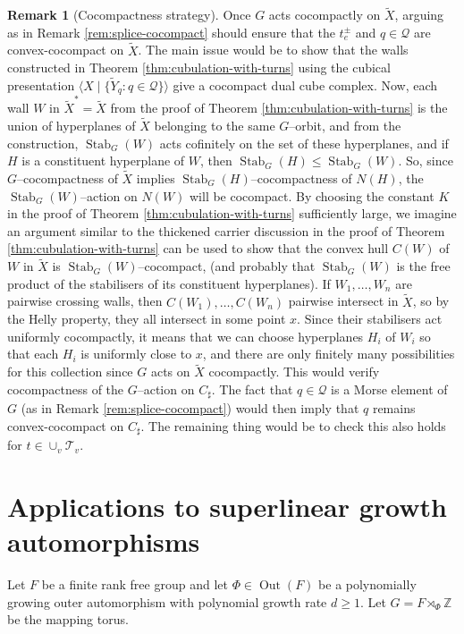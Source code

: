 \documentclass[11pt,oneside]{amsart}
\theoremstyle{definition}
\newtheorem{rem}[thm]{Remark}
\DeclareMathOperator{\Out}{Out}
\DeclareMathOperator{\stabilizer}{Stab}
\newcommand{\field}[1]{\mathbb{#1}}
\newcommand{\integers}{\ensuremath{\field{Z}}}
\begin{document}
\begin{rem}[Cocompactness strategy]
Once $G$ acts cocompactly on $\widetilde X$, arguing as in Remark \ref{rem:splice-cocompact} should ensure that the $t_e^\pm$ and $q\in\mathcal Q$ are convex-cocompact on $\widetilde X$.  The main issue would be to show that the walls constructed in Theorem \ref{thm:cubulation-with-turns} using the cubical presentation $\langle X\mid\{\widetilde Y_q:q\in\mathcal Q\}\rangle$ give a cocompact dual cube complex.  Now, each wall $W$ in $\widetilde X^*=\widetilde X$ from the proof of Theorem \ref{thm:cubulation-with-turns} is the union of hyperplanes of $\widetilde X$ belonging to the same $G$--orbit, and from the construction, $\stabilizer_G(W)$ acts cofinitely on the set of these hyperplanes, and if $H$ is a constituent hyperplane of $W$, then $\stabilizer_G(H)\leq \stabilizer_G(W)$.  So, since $G$--cocompactness of $\widetilde X$ implies $\stabilizer_G(H)$--cocompactness of $N(H)$, the $\stabilizer_G(W)$--action on $N(W)$ will be cocompact.  By choosing the constant $K$ in the proof of Theorem \ref{thm:cubulation-with-turns} sufficiently large, we imagine an argument similar to the thickened carrier discussion in the proof of Theorem \ref{thm:cubulation-with-turns} can be used to show that the convex hull $C(W)$ of $W$ in $\widetilde X$ is $\stabilizer_G(W)$--cocompact, (and probably that $\stabilizer_G(W)$ is the free product of the stabilisers of its constituent hyperplanes).  If $W_1,\ldots,W_n$ are pairwise crossing walls, then $C(W_1),\ldots,C(W_n)$ pairwise intersect in $\widetilde X$, so by the Helly property, they all intersect in some point $x$.  Since their stabilisers act uniformly cocompactly, it means that we can choose hyperplanes $H_i$ of $W_i$ so that each $H_i$ is uniformly close to $x$, and there are only finitely many possibilities for this collection since $G$ acts on $\widetilde X$ cocompactly.  This would verify cocompactness of the $G$--action on $C_\sharp$.  The fact that $q\in\mathcal Q$ is a Morse element of $G$ (as in Remark \ref{rem:splice-cocompact}) would then imply that $q$ remains convex-cocompact on $C_\sharp$.  The remaining thing would be to check this also holds for  $t\in\cup_v\mathcal T_v$.   
\end{rem}


\section{Applications to superlinear growth automorphisms}\label{sec:conclusion}
Let $F$ be a finite rank free group and let $\Phi\in\Out(F)$ be a polynomially growing outer automorphism with polynomial growth rate $d\geq 1$.  Let $G=F\rtimes_\Phi\integers$ be the mapping torus.
\end{document}
